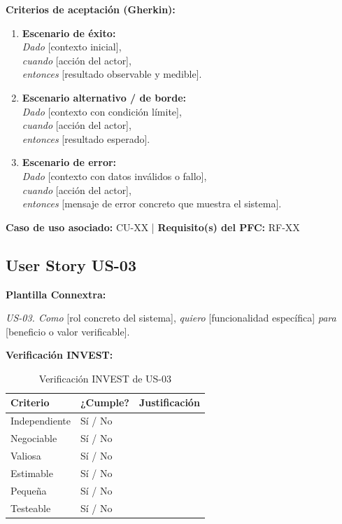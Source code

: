 \documentclass[journal,onecolumn]{IEEEtran}
\begin{document}
\textbf{Criterios de aceptación (Gherkin):}

\begin{enumerate}[leftmargin=*]
  \item \textbf{Escenario de éxito:}\\
        \textit{Dado} [contexto inicial],\\
        \textit{cuando} [acción del actor],\\
        \textit{entonces} [resultado observable y medible].

  \item \textbf{Escenario alternativo / de borde:}\\
        \textit{Dado} [contexto con condición límite],\\
        \textit{cuando} [acción del actor],\\
        \textit{entonces} [resultado esperado].

  \item \textbf{Escenario de error:}\\
        \textit{Dado} [contexto con datos inválidos o fallo],\\
        \textit{cuando} [acción del actor],\\
        \textit{entonces} [mensaje de error concreto que muestra el sistema].
\end{enumerate}

\textbf{Caso de uso asociado:} CU-XX | \textbf{Requisito(s) del PFC:} RF-XX

\subsection{User Story US-03}

\textbf{Plantilla Connextra:}

\begin{mdframed}[style=guia]
\textit{US-03. Como} [rol concreto del sistema], \textit{quiero} [funcionalidad específica]
\textit{para} [beneficio o valor verificable].
\end{mdframed}

\textbf{Verificación INVEST:}

\begin{table}[H]
\caption{Verificación INVEST de US-03}
\label{tab:invest03}
\begin{tabularx}{\textwidth}{|l|l|X|}
\hline
\textbf{Criterio} & \textbf{¿Cumple?} & \textbf{Justificación} \\
\hline
Independiente  & Sí / No & \\
\hline
Negociable     & Sí / No & \\
\hline
Valiosa        & Sí / No & \\
\hline
Estimable      & Sí / No & \\
\hline
Pequeña        & Sí / No & \\
\hline
Testeable      & Sí / No & \\
\hline
\end{tabularx}
\end{table}
\end{document}
